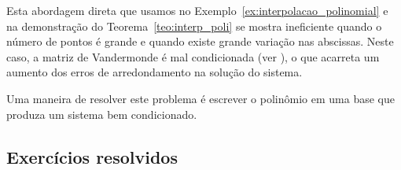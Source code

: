 
Esta abordagem direta que usamos no Exemplo~\ref{ex:interpolacao_polinomial} e na demonstração do Teorema~\ref{teo:interp_poli} se mostra ineficiente quando o número de pontos é grande e quando existe grande variação nas abscissas. Neste caso, a matriz de Vandermonde é mal condicionada (ver \cite{Gautschi}), o que acarreta um aumento dos erros de arredondamento na solução do sistema.

Uma maneira de resolver este problema é escrever o polinômio em uma base que produza um sistema bem condicionado.

\subsection*{Exercícios resolvidos}

\construirExeresol

